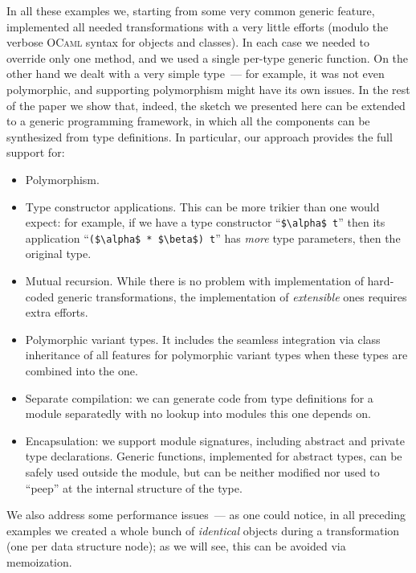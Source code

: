 In all these examples we, starting from some very common generic feature, implemented all needed transformations with a very little efforts (modulo
the verbose \textsc{OCaml} syntax for objects and classes). In each case we needed to override only one method, and we used a single per-type generic
function. On the other hand we dealt with a very simple type~--- for example, it was not even polymorphic, and supporting polymorphism might have
its own issues. In the rest of the paper we show that, indeed, the sketch we presented here can be extended to a generic programming
framework, in which all the components can be synthesized from type definitions. In particular, our approach provides the full support for:

\begin{itemize}
\item Polymorphism.
\item Type constructor applications. This can be more trikier than one would expect: for example, if
  we have a type constructor ``\lstinline{$\alpha$ t}'' then its application ``\lstinline{($\alpha$ * $\beta$) t}'' has
  \emph{more} type parameters, then the original type.
\item Mutual recursion. While there is no problem with implementation of hard-coded generic transformations, the implementation of \emph{extensible} ones
  requires extra efforts.
\item Polymorphic variant types. It includes the seamless integration via class inheritance of all features
  for polymorphic variant types when these types are combined into the one.
\item Separate compilation: we can generate code from type definitions for a module separatedly with no lookup into
  modules this one depends on.
\item Encapsulation: we support module signatures, including abstract and private type declarations. Generic functions, implemented for
  abstract types, can be safely used outside the module, but can be neither modified nor used to ``peep'' at the internal structure of
  the type.  
\end{itemize}

We also address some performance issues~--- as one could notice, in all preceding examples we created a whole bunch of \emph{identical} objects during a
transformation (one per data structure node); as we will see, this can be avoided via memoization.
